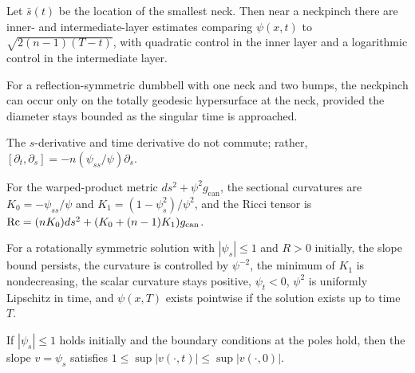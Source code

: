 \begin{theorem}
\label{ch02-thm-neckpinch-asymptotics}
Let \(\bar s(t)\) be the location of the smallest neck. Then near a neckpinch
there are inner- and intermediate-layer estimates comparing \(\psi(x,t)\) to
\(\sqrt{2(n-1)(T-t)}\), with quadratic control in the inner layer and a logarithmic
control in the intermediate layer.
\end{theorem}

\begin{remark}
\label{ch02-rem-single-point-pinching}
For a reflection-symmetric dumbbell with one neck and two bumps, the
neckpinch can occur only on the totally geodesic hypersurface at the neck,
provided the diameter stays bounded as the singular time is approached.
\end{remark}

\begin{remark}
\label{ch02-rem-neckpinch-pde}
The \(s\)-derivative and time derivative do not commute; rather,
\([\partial_t,\partial_s]=-n(\psi_{ss}/\psi)\partial_s\).
\end{remark}

\begin{remark}
\label{ch02-rem-neckpinch-curvatures}
For the warped-product metric \(ds^2+\psi^2g_{\mathrm{can}}\), the sectional
curvatures are \(K_0=-\psi_{ss}/\psi\) and \(K_1=(1-\psi_s^2)/\psi^2\), and
the Ricci tensor is \(\operatorname{Rc}=(nK_0)ds^2+(K_0+(n-1)K_1)g_{\mathrm{can}}\).
\end{remark}

\begin{proposition}
\label{ch02-prop-neckpinch-bounds}
For a rotationally symmetric solution with \(|\psi_s|\le 1\) and \(R>0\)
initially, the slope bound persists, the curvature is controlled by
\(\psi^{-2}\), the minimum of \(K_1\) is nondecreasing, the scalar curvature
stays positive, \(\psi_t<0\), \(\psi^2\) is uniformly Lipschitz in time, and
\(\psi(x,T)\) exists pointwise if the solution exists up to time \(T\).
\end{proposition}

\begin{lemma}
\label{ch02-lem-neckpinch-slope}
If \(|\psi_s|\le 1\) holds initially and the boundary conditions at the poles
hold, then the slope \(v=\psi_s\) satisfies \(1\le \sup|v(\cdot,t)|\le \sup|v(\cdot,0)|\).
\end{lemma}

